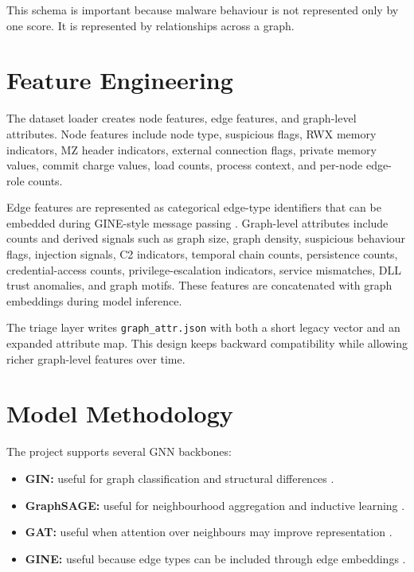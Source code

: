 This schema is important because malware behaviour is not represented only by one score. It is represented by relationships across a graph.

\section{Feature Engineering}

The dataset loader creates node features, edge features, and graph-level attributes. Node features include node type, suspicious flags, RWX memory indicators, MZ header indicators, external connection flags, private memory values, commit charge values, load counts, process context, and per-node edge-role counts.

Edge features are represented as categorical edge-type identifiers that can be embedded during GINE-style message passing \cite{xu2019gin}. Graph-level attributes include counts and derived signals such as graph size, graph density, suspicious behaviour flags, injection signals, C2 indicators, temporal chain counts, persistence counts, credential-access counts, privilege-escalation indicators, service mismatches, DLL trust anomalies, and graph motifs. These features are concatenated with graph embeddings during model inference.

The triage layer writes \texttt{graph\_attr.json} with both a short legacy vector and an expanded attribute map. This design keeps backward compatibility while allowing richer graph-level features over time.

\section{Model Methodology}

The project supports several GNN backbones:

\begin{itemize}
\item \textbf{GIN:} useful for graph classification and structural differences \cite{xu2019gin}.
\item \textbf{GraphSAGE:} useful for neighbourhood aggregation and inductive learning \cite{hamilton2017graphsage}.
\item \textbf{GAT:} useful when attention over neighbours may improve representation \cite{velickovic2018gat}.
\item \textbf{GINE:} useful because edge types can be included through edge embeddings \cite{xu2019gin}.
\end{itemize}

